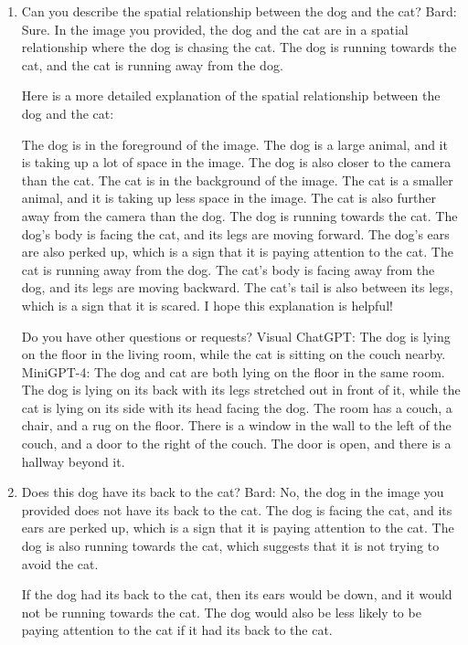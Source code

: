 \begin{enumerate}
    \item Can you describe the spatial relationship between the dog and the cat?
    \subitem Bard: Sure. In the image you provided, the dog and the cat are in a spatial relationship where the dog is chasing the cat. The dog is running towards the cat, and the cat is running away from the dog.

    Here is a more detailed explanation of the spatial relationship between the dog and the cat:
    
    The dog is in the foreground of the image. The dog is a large animal, and it is taking up a lot of space in the image. The dog is also closer to the camera than the cat.
    The cat is in the background of the image. The cat is a smaller animal, and it is taking up less space in the image. The cat is also further away from the camera than the dog.
    The dog is running towards the cat. The dog's body is facing the cat, and its legs are moving forward. The dog's ears are also perked up, which is a sign that it is paying attention to the cat.
    The cat is running away from the dog. The cat's body is facing away from the dog, and its legs are moving backward. The cat's tail is also between its legs, which is a sign that it is scared.
    I hope this explanation is helpful!
    
    Do you have other questions or requests?
    \subitem Visual ChatGPT: The dog is lying on the floor in the living room, while the cat is sitting on the couch nearby.
    \subitem MiniGPT-4: The dog and cat are both lying on the floor in the same room. The dog is lying on its back with its legs stretched out in front of it, while the cat is lying on its side with its head facing the dog. The room has a couch, a chair, and a rug on the floor. There is a window in the wall to the left of the couch, and a door to the right of the couch. The door is open, and there is a hallway beyond it.
    \item Does this dog have its back to the cat?
    \subitem Bard: 
    No, the dog in the image you provided does not have its back to the cat. The dog is facing the cat, and its ears are perked up, which is a sign that it is paying attention to the cat. The dog is also running towards the cat, which suggests that it is not trying to avoid the cat.
    
    If the dog had its back to the cat, then its ears would be down, and it would not be running towards the cat. The dog would also be less likely to be paying attention to the cat if it had its back to the cat.
    

\end{enumerate}
